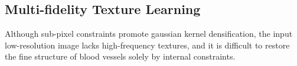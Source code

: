 \documentclass[runningheads]{llncs}
\begin{document}
\subsection{Multi-fidelity Texture Learning}%
Although sub-pixel constraints promote gaussian kernel densification, the input low-resolution image lacks high-frequency textures, and it is difficult to restore the fine structure of blood vessels solely by internal constraints.
\end{document}
